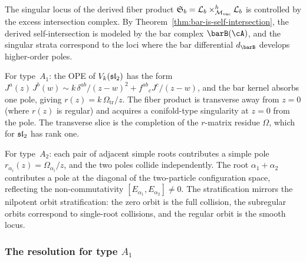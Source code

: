 \begin{remark}[Evidence]
The singular locus of the derived fiber product
$\mathfrak{S}_b = \mathcal{L}_b \times_{{\mathcal{M}_{\mathrm{vac}}}}^h \mathcal{L}_b$ is
controlled by the excess intersection complex. By
Theorem~\ref{thm:bar-is-self-intersection}, the derived
self-intersection is modeled by the bar complex $\barB(\cA)$, and
the singular strata correspond to the loci where the bar differential
$d_{\barB}$ develops higher-order poles.

For type~$A_1$: the OPE of $V_k(\mathfrak{sl}_2)$ has the form
$J^a(z)\,J^b(w) \sim k\,\delta^{ab}/(z-w)^2 + f^{ab}{}_c J^c/(z-w)$,
and the bar kernel absorbs one pole, giving
$r(z) = k\,\Omega_{\mathrm{tr}}/z$. The fiber product is transverse away from $z = 0$
(where $r(z)$ is regular) and acquires a conifold-type singularity at
$z = 0$ from the pole. The transverse slice is the completion of the
$r$-matrix residue $\Omega$, which for $\mathfrak{sl}_2$ has rank one.

For type~$A_2$: each pair of adjacent simple roots contributes a
simple pole $r_{\alpha_i}(z) = \Omega_{\alpha_i}/z$, and
the two poles collide independently. The root
$\alpha_1 + \alpha_2$ contributes a pole at the diagonal of the
two-particle configuration space, reflecting the non-commutativity
$[E_{\alpha_1}, E_{\alpha_2}] \neq 0$. The stratification
mirrors the nilpotent orbit stratification: the zero orbit is
the full collision, the subregular orbits correspond to single-root
collisions, and the regular orbit is the smooth locus.
\end{remark}

\subsubsection{The resolution for type $A_1$}

